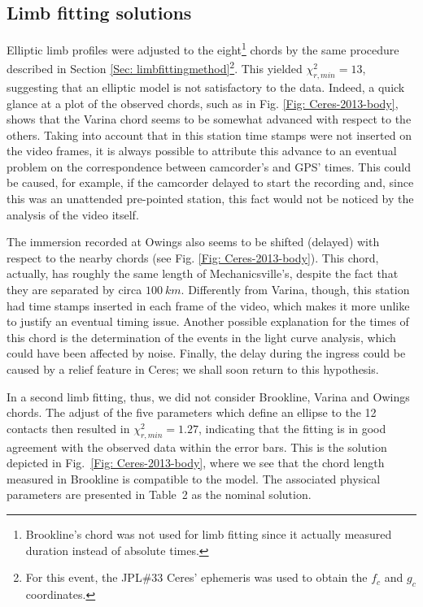 \documentclass[useAMS,usenatbib]{mn2e}
\begin{document}
\subsection{Limb fitting solutions}

Elliptic limb profiles were adjusted to the eight\footnote{Brookline's chord was not used for limb fitting since it actually measured duration instead of absolute times.} chords by the same procedure described in Section \ref{Sec: limbfittingmethod}\footnote{For this event, the JPL\#33 Ceres' ephemeris was used to obtain the $f_{c}$ and $g_{c}$ coordinates.}. This yielded $\chi^2_{r,min} = 13$, suggesting that an elliptic model is not satisfactory to the data. Indeed, a quick glance at a plot of the observed chords, such as in Fig. \ref{Fig: Ceres-2013-body}, shows that the Varina chord seems to be somewhat advanced with respect to the others. Taking into account that in this station time stamps were not inserted on the video frames, it is always possible to attribute this advance to an eventual problem on the correspondence between camcorder's and GPS' times. This could be caused, for example, if the camcorder delayed to start the recording and, since this was an unattended pre-pointed station, this fact would not be noticed by the analysis of the video itself.

The immersion recorded at Owings also seems to be shifted (delayed) with respect to the nearby chords (see Fig. \ref{Fig: Ceres-2013-body}). This chord, actually, has roughly the same length of Mechanicsville's, despite the fact that they are separated by circa $100~km$. Differently from Varina, though, this station had time stamps inserted in each frame of the video, which makes it more unlike to justify an eventual timing issue. Another possible explanation for the times of this chord is the determination of the events in the light curve analysis, which could have been affected by noise. Finally, the delay during the ingress could be caused by a relief feature in Ceres; we shall soon return to this hypothesis.


In a second limb fitting, thus, we did not consider Brookline, Varina and Owings chords. The adjust of the five parameters which define an ellipse to the 12 contacts then resulted in $\chi^2_{r,min} = 1.27$, indicating that the fitting is in good agreement with the observed data within the error bars. This is the solution depicted in Fig.~\ref{Fig: Ceres-2013-body}, where we see that the chord length measured in Brookline is compatible to the model. The associated physical parameters are presented in Table~2 as the nominal solution.
\end{document}
